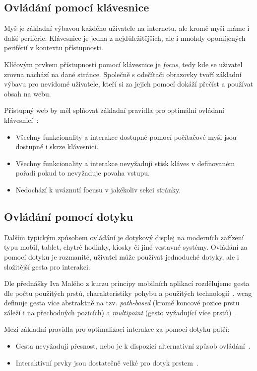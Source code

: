 \subsection{Ovládání pomocí klávesnice}

Myš je základní výbavou každého uživatele na internetu, ale kromě myši máme i další periférie.
Klávesnice je jedna z nejdůležitějších, ale i mnohdy opomíjených periférií v kontextu přístupnosti.

Klíčovým prvkem přístupnosti pomocí klávesnice je \textit{focus}, tedy kde se uživatel zrovna nachází na dané stránce.
Společně s odečítači obrazovky tvoří základní výbavu pro nevidomé uživatele, kteří si za jejich pomocí dokáží přečíst a používat obsah na webu.

Přístupný web by měl splňovat základní pravidla pro optimální ovládaní klávesnicí~\cite{wcag-keyboard}:

\begin{itemize}
  \item Všechny funkcionality a interakce dostupné pomocí počítačové myši jsou dostupné i skrze klávesnici.
  \item Všechny funkcionality a interakce nevyžadují stisk kláves v definovaném pořadí pokud to nevyžaduje povaha vstupu.
  \item Nedochází k uváznutí focusu v jakékoliv sekci stránky.
\end{itemize}

\subsection{Ovládání pomocí dotyku}

Dalším typickým způsobem ovládání je dotykový displej na moderních zařízení typu mobil, tablet, chytré hodinky, kiosky či jiné vestavné systémy.
Ovládání za pomocí dotyku je rozmanité, uživatel může používat jednoduché dotyky, ale i složitější gesta pro interakci.

Dle přednášky Iva Malého z kurzu principy mobilních aplikací rozdělujeme gesta dle počtu použitých prstů, charakteristiky pohybu a použitých technologií~\cite{ctu-pda-11}.
\gls{wcag} definuje gesta více abstraktně na tzv. \textit{path-based} (kromě koncové pozice prstu záleží i na přechodných pozicích) a \textit{multipoint} (gesto vyžadující více prstů)~\cite{wcag-pointer-gestures}.

Mezi základní pravidla pro optimalizaci interakce za pomocí dotyku patří:

\begin{itemize}
  \item Gesta nevyžadují přesnost, nebo je k dispozici alternativní způsob ovládání~\cite{wcag-pointer-gestures}.
  \item Interaktivní prvky jsou dostatečně velké pro dotyk prstem~\cite{wcag-target-size}.
\end{itemize}

